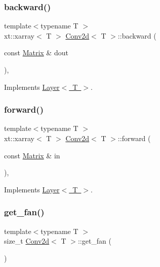 \subsubsection{\texorpdfstring{backward()}{backward()}}
{\footnotesize\ttfamily template$<$typename T $>$ \\
xt\+::xarray$<$ T $>$ \mbox{\hyperlink{class_conv2d}{Conv2d}}$<$ T $>$\+::backward (\begin{DoxyParamCaption}\item[{const \mbox{\hyperlink{class_conv2d_a8263e2f2c46243e39fbca5712603c0fd}{Matrix}} \&}]{dout }\end{DoxyParamCaption})\hspace{0.3cm}{\ttfamily [override]}, {\ttfamily [virtual]}}



Implements \mbox{\hyperlink{class_layer_ac4c13a3a85bfdd4d7d4d18669e3299fe}{Layer$<$ T $>$}}.

\mbox{\label{class_conv2d_ab795f6a1cabcfedfb2fcb55c9389c2fe}} 
\subsubsection{\texorpdfstring{forward()}{forward()}}
{\footnotesize\ttfamily template$<$typename T $>$ \\
xt\+::xarray$<$ T $>$ \mbox{\hyperlink{class_conv2d}{Conv2d}}$<$ T $>$\+::forward (\begin{DoxyParamCaption}\item[{const \mbox{\hyperlink{class_conv2d_a8263e2f2c46243e39fbca5712603c0fd}{Matrix}} \&}]{in }\end{DoxyParamCaption})\hspace{0.3cm}{\ttfamily [override]}, {\ttfamily [virtual]}}



Implements \mbox{\hyperlink{class_layer_ab15b665c86974b1cf1d7ba4e309cb0e5}{Layer$<$ T $>$}}.

\mbox{\label{class_conv2d_a6eeedff6c4d0864a4c3788e06e82a2e4}} 
\subsubsection{\texorpdfstring{get\_fan()}{get\_fan()}}
{\footnotesize\ttfamily template$<$typename T $>$ \\
size\+\_\+t \mbox{\hyperlink{class_conv2d}{Conv2d}}$<$ T $>$\+::get\+\_\+fan (\begin{DoxyParamCaption}{ }\end{DoxyParamCaption})\hspace{0.3cm}{\ttfamily [virtual]}}



